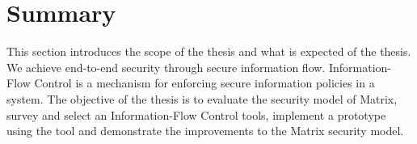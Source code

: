 \section{Summary}
This section introduces the scope of the thesis and what is expected of the thesis. We achieve end-to-end security through secure information flow. Information-Flow Control is a mechanism for enforcing secure information policies in a system. The objective of the thesis is to evaluate the security model of Matrix, survey and select an Information-Flow Control tools, implement a prototype using the tool and demonstrate the improvements to the Matrix security model. 
